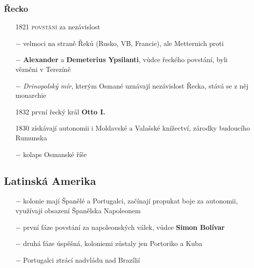 \documentclass{article}
\begin{document}
\subsubsection*{Řecko}
\begin{itemize}
    \vspace{-0.5em}
    \setlength\itemsep{0.15em}
    \item[1821] \textsc{povstání} za nezávislost
    \item[$-$] velmoci na straně Řeků (Rusko, VB, Francie), ale Metternich proti
    \item[$-$] \textbf{Alexander} a \textbf{Demeterius Ypsilanti}, vůdce řeckého povstání, byli vězněni v Terezíně
    \item[$-$] \textit{Drinopolský mír}, kterým Osmané uznávají nezávislost Řecka, stává se z něj monarchie
    \item[1832] první řecký král \textbf{Otto I.}
    \item[1830] získávají autonomii i Moldavské a Valašské knížectví, zárodky budoucího Rumunska
    \item[$-$] kolaps Osmanské říše
\end{itemize}

\subsection*{Latinská Amerika}
\begin{itemize}
    \vspace{-0.5em}
    \setlength\itemsep{0.15em}
    \item[$-$] kolonie mají Španělé a Portugalci, začínají propukat boje za autonomii, využívají obsazení Španělska Napoleonem
    \item[$-$] první fáze povstání za napoleonských válek, vůdce \textbf{Simon Bolívar}
    \item[$-$] druhá fáze úspěšná, koloniemi zůstaly jen Portoriko a Kuba
    \item[$-$] Portugalci ztrácí nadvládu nad Brazílií
\end{itemize}
\end{document}
